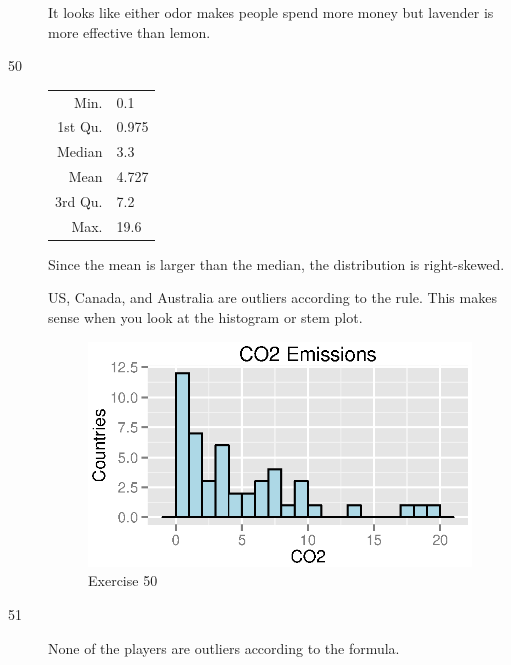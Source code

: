 \documentclass{exam}
\begin{document}
\begin{description}
        It looks like either odor makes people spend more money but lavender is more effective than lemon.

      \item[50]
        \begin{table}[H]
          \centering
          \begin{tabular}{rl}
            \toprule
            Min.    & 0.1 \\
            1st Qu. & 0.975 \\
            Median  & 3.3 \\
            Mean    & 4.727 \\
            3rd Qu. & 7.2 \\
            Max.    & 19.6 \\
            \bottomrule
          \end{tabular}
        \end{table}

        Since the mean is larger than the median, the distribution is right-skewed.

        US, Canada, and Australia are outliers according to the rule.  This makes sense when you look at the histogram
        or stem plot.

        \begin{figure}[H]
          \centering
          \includegraphics{figures/ex50.eps}
          \caption{Exercise 50}
        \end{figure}

      \item[51] None of the players are outliers according to the formula.

    \end{description}
\end{document}
